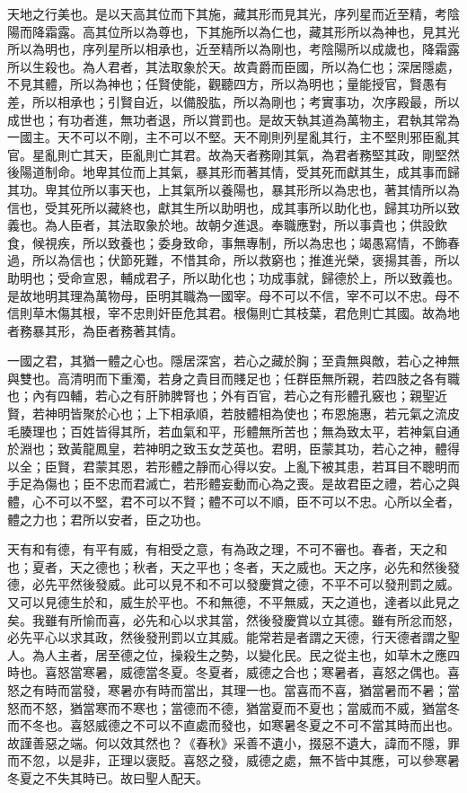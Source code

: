 
天地之行美也。是以天高其位而下其施，藏其形而見其光，序列星而近至精，考陰陽而降霜露。高其位所以為尊也，下其施所以為仁也，藏其形所以為神也，見其光所以為明也，序列星所以相承也，近至精所以為剛也，考陰陽所以成歲也，降霜露所以生殺也。為人君者，其法取象於天。故貴爵而臣國，所以為仁也；深居隱處，不見其體，所以為神也；任賢使能，觀聽四方，所以為明也；量能授官，賢愚有差，所以相承也；引賢自近，以備股肱，所以為剛也；考實事功，次序殿最，所以成世也；有功者進，無功者退，所以賞罰也。是故天執其道為萬物主，君執其常為一國主。天不可以不剛，主不可以不堅。天不剛則列星亂其行，主不堅則邪臣亂其官。星亂則亡其天，臣亂則亡其君。故為天者務剛其氣，為君者務堅其政，剛堅然後陽道制命。地卑其位而上其氣，暴其形而著其情，受其死而獻其生，成其事而歸其功。卑其位所以事天也，上其氣所以養陽也，暴其形所以為忠也，著其情所以為信也，受其死所以藏終也，獻其生所以助明也，成其事所以助化也，歸其功所以致義也。為人臣者，其法取象於地。故朝夕進退。奉職應對，所以事貴也；供設飲食，候視疾，所以致養也；委身致命，事無專制，所以為忠也；竭愚寫情，不飾春過，所以為信也；伏節死難，不惜其命，所以救窮也；推進光榮，褒揚其善，所以助明也；受命宣恩，輔成君子，所以助化也；功成事就，歸德於上，所以致義也。是故地明其理為萬物母，臣明其職為一國宰。母不可以不信，宰不可以不忠。母不信則草木傷其根，宰不忠則奸臣危其君。根傷則亡其枝葉，君危則亡其國。故為地者務暴其形，為臣者務著其情。

一國之君，其猶一體之心也。隱居深宮，若心之藏於胸；至貴無與敵，若心之神無與雙也。高清明而下重濁，若身之貴目而賤足也；任群臣無所親，若四肢之各有職也；內有四輔，若心之有肝肺脾腎也；外有百官，若心之有形體孔竅也；親聖近賢，若神明皆聚於心也；上下相承順，若肢體相為使也；布恩施惠，若元氣之流皮毛腠理也；百姓皆得其所，若血氣和平，形體無所苦也；無為致太平，若神氣自通於淵也；致黃龍鳳皇，若神明之致玉女芝英也。君明，臣蒙其功，若心之神，體得以全；臣賢，君蒙其恩，若形體之靜而心得以安。上亂下被其患，若耳目不聰明而手足為傷也；臣不忠而君滅亡，若形體妄動而心為之喪。是故君臣之禮，若心之與體，心不可以不堅，君不可以不賢；體不可以不順，臣不可以不忠。心所以全者，體之力也；君所以安者，臣之功也。


	
天有和有德，有平有威，有相受之意，有為政之理，不可不審也。春者，天之和也；夏者，天之德也；秋者，天之平也；冬者，天之威也。天之序，必先和然後發德，必先平然後發威。此可以見不和不可以發慶賞之德，不平不可以發刑罰之威。又可以見德生於和，威生於平也。不和無德，不平無威，天之道也，達者以此見之矣。我雖有所愉而喜，必先和心以求其當，然後發慶賞以立其德。雖有所忿而怒，必先平心以求其政，然後發刑罰以立其威。能常若是者謂之天德，行天德者謂之聖人。為人主者，居至德之位，操殺生之勢，以變化民。民之從主也，如草木之應四時也。喜怒當寒暑，威德當冬夏。冬夏者，威德之合也；寒暑者，喜怒之偶也。喜怒之有時而當發，寒暑亦有時而當出，其理一也。當喜而不喜，猶當暑而不暑；當怒而不怒，猶當寒而不寒也；當德而不德，猶當夏而不夏也；當威而不威，猶當冬而不冬也。喜怒威德之不可以不直處而發也，如寒暑冬夏之不可不當其時而出也。故謹善惡之端。何以效其然也？《春秋》采善不遺小，掇惡不遺大，諱而不隱，罪而不忽，以是非，正理以褒貶。喜怒之發，威德之處，無不皆中其應，可以參寒暑冬夏之不失其時已。故曰聖人配天。

